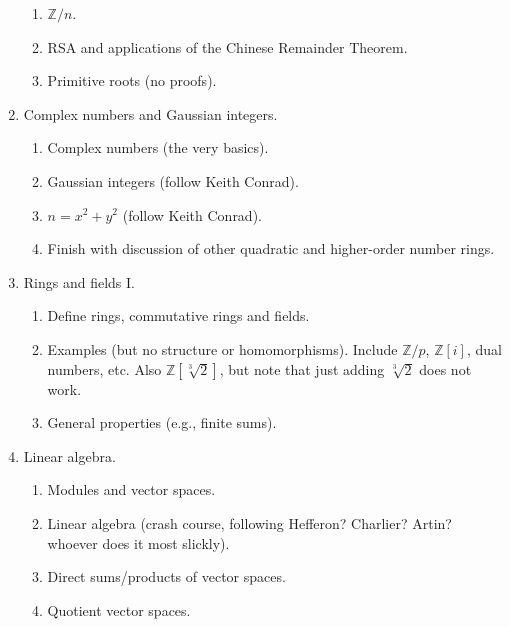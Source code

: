 \documentclass[numbers=enddot,12pt,final,onecolumn,notitlepage]{scrartcl}%
\theoremstyle{definition}
\begin{document}
\begin{enumerate}
\begin{enumerate}
\item $\mathbb{Z}/n$.

\item RSA and applications of the Chinese Remainder Theorem.

\item Primitive roots (no proofs).
\end{enumerate}

\item Complex numbers and Gaussian integers.

\begin{enumerate}
\item Complex numbers (the very basics).

\item Gaussian integers (follow Keith Conrad).

\item $n=x^{2}+y^{2}$ (follow Keith Conrad).

\item Finish with discussion of other quadratic and higher-order number rings.
\end{enumerate}

\item Rings and fields I.

\begin{enumerate}
\item Define rings, commutative rings and fields.

\item Examples (but no structure or homomorphisms). Include $\mathbb{Z}/p$,
$\mathbb{Z}\left[  i\right]  $, dual numbers, etc. Also $\mathbb{Z}\left[
\sqrt[3]{2}\right]  $, but note that just adding $\sqrt[3]{2}$ does not work.

\item General properties (e.g., finite sums).
\end{enumerate}

\item Linear algebra.

\begin{enumerate}
\item Modules and vector spaces.

\item Linear algebra (crash course, following Hefferon? Charlier? Artin?
whoever does it most slickly).

\item Direct sums/products of vector spaces.

\item Quotient vector spaces.


\end{enumerate}
\end{enumerate}
\end{document}
